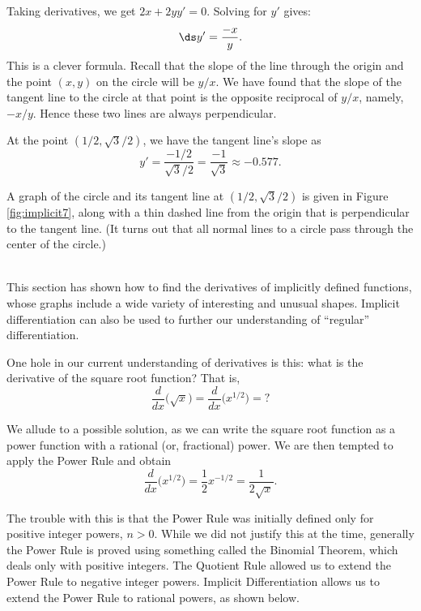 {%
Taking derivatives, we get $2x+2yy'=0$.  Solving for $y'$  gives: $$\ds y' = \frac{-x}{y}.$$ 
This is a clever formula. Recall that the slope of the line through the origin and the point $(x,y)$ on the circle will be $y/x$. We have found that the slope of the tangent line to the circle at that point is the opposite reciprocal of $y/x$, namely, $-x/y$. Hence these two lines are always perpendicular.

At the point $(1/2, \sqrt{3}/2)$, we have the tangent line's slope as
$$y' = \frac{-1/2}{\sqrt{3}/2} = \frac{-1}{\sqrt{3}} \approx -0.577.$$

A graph of the circle and its tangent line at $(1/2,\sqrt{3}/2)$ is given in Figure \ref{fig:implicit7}, along with a thin dashed line from the origin that is perpendicular to the tangent line. (It turns out that all normal lines to a circle pass through the center of the circle.)
}\\

This section has shown how to find the derivatives of implicitly defined functions, whose graphs include a wide variety of interesting and unusual shapes. Implicit differentiation can also be used to further our understanding of ``regular'' differentiation. 

One hole in our current understanding of derivatives is this: what is the derivative of the square root function? That is, $$\frac{d}{dx}\big(\sqrt{x}\big) = \frac{d}{dx}\big(x^{1/2}\big) = \text{?}$$

We allude to a possible solution, as we can write the square root function as a power function with a rational (or, fractional) power. We are then tempted to apply the Power Rule and obtain $$\frac{d}{dx}\big(x^{1/2}\big) = \frac12x^{-1/2} = \frac{1}{2\sqrt{x}}.$$

The trouble with this is that the Power Rule was initially defined only for positive integer powers, $n>0$. While we did not justify this at the time, generally the Power Rule is proved using something called the Binomial Theorem, which deals only with positive integers. The Quotient Rule allowed us to extend the Power Rule to negative integer powers. Implicit Differentiation allows us to extend the Power Rule to rational powers, as shown below.

